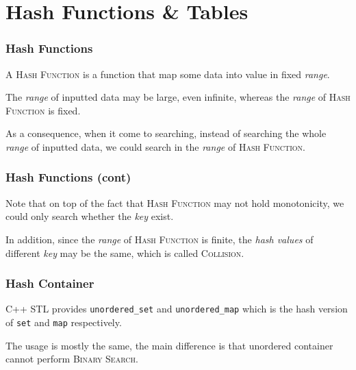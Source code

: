 \documentclass{beamer}
\begin{document}
\section{Hash Functions \& Tables}

\frame
{
	\frametitle{Hash Functions}
	
	A \textsc{Hash Function} is a function that map some data into value in fixed \textit{range}.
	
	The \textit{range} of inputted data may be large, even infinite, whereas the \textit{range} of \textsc{Hash Function} is fixed.
	
	As a consequence, when it come to searching, instead of searching the whole \textit{range} of inputted data, we could search in the \textit{range} of \textsc{Hash Function}.
}

\frame
{
	\frametitle{Hash Functions (cont)}
	
	Note that on top of the fact that \textsc{Hash Function} may not hold monotonicity, we could only search whether the \textit{key} exist.
	
	In addition, since the \textit{range} of \textsc{Hash Function} is finite, the \textit{hash values} of different \textit{key} may be the same, which is called \textsc{Collision}.
}

\frame
{
	\frametitle{Hash Container}
	
	C++ STL provides \texttt{unordered\_set} and \texttt{unordered\_map} which is the hash version of \texttt{set} and \texttt{map} respectively.
	
	The usage is mostly the same, the main difference is that unordered container cannot perform \textsc{Binary Search}.
}
\end{document}
